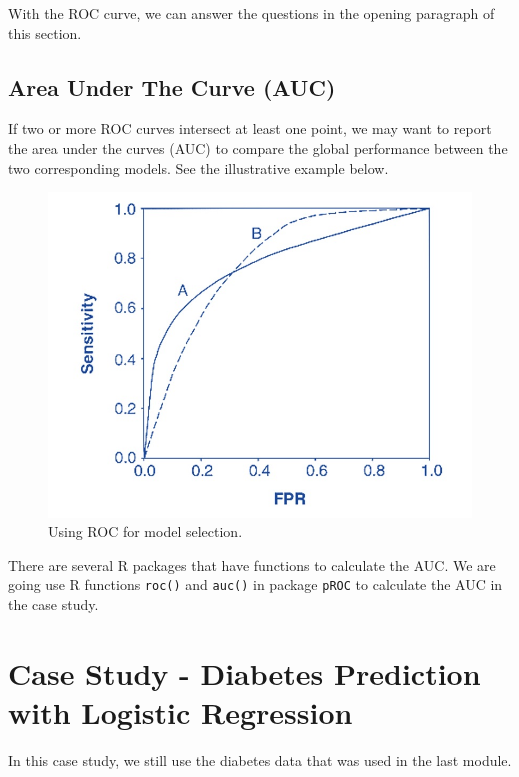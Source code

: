 \documentclass[
]{book}
\begin{document}
With the ROC curve, we can answer the questions in the opening paragraph of this section.

\hypertarget{area-under-the-curve-auc}{%
\subsection{Area Under The Curve (AUC)}\label{area-under-the-curve-auc}}

If two or more ROC curves intersect at least one point, we may want to report the area under the curves (AUC) to compare the global performance between the two corresponding models. See the illustrative example below.

\begin{figure}

{\centering \includegraphics[width=0.8\linewidth]{img08/w08-Equal-AUC-ROC} 

}

\caption{Using ROC for model selection.}\label{fig:unnamed-chunk-131}
\end{figure}

There are several R packages that have functions to calculate the AUC. We are going use R functions \texttt{roc()} and \texttt{auc()} in package \texttt{pROC} to calculate the AUC in the case study.

\hypertarget{case-study---diabetes-prediction-with-logistic-regression}{%
\section{Case Study - Diabetes Prediction with Logistic Regression}\label{case-study---diabetes-prediction-with-logistic-regression}}

In this case study, we still use the diabetes data that was used in the last module.
\end{document}
